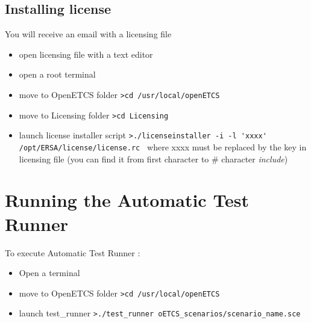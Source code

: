 \documentclass{template/openetcs_article}
\begin{document}
\subsection{Installing license}
You will receive an email with a licensing file
\begin{itemize}
	\item open licensing file with a text editor
	\item open a root terminal
	\item move to OpenETCS folder
	\newline
	\verb|>cd /usr/local/openETCS |	
	\item move to Licensing folder
	\newline
	\verb|>cd Licensing |
	\item launch license installer script
	\newline
	\verb|>./licenseinstaller -i -l 'xxxx' /opt/ERSA/license/license.rc |	where xxxx must be replaced by the key in licensing file (you can find it from first character to \# character \emph{include})
\end{itemize}
\newpage
\section{Running the Automatic Test Runner}
To execute Automatic Test Runner : 
\begin{itemize}
	\item Open a terminal
	\item move to OpenETCS folder
	\newline
	\verb|>cd /usr/local/openETCS |		
	\item launch test\_runner
	\newline
	\verb|>./test_runner oETCS_scenarios/scenario_name.sce |	
\end{itemize}


\end{document}
